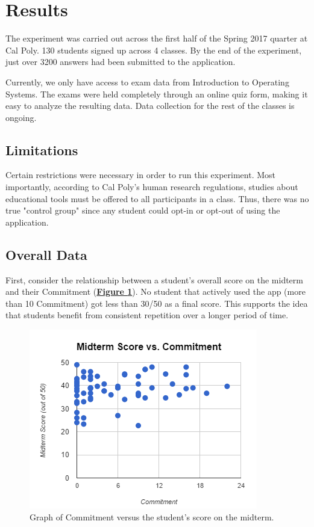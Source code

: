 \section{Results}
\par The experiment was carried out across the first half of the Spring 2017 quarter at Cal Poly. 130 students signed up across 4 classes. By the end of the experiment, just over 3200 answers had been submitted to the application.

\par Currently, we only have access to exam data from Introduction to Operating Systems. The exams were held completely through an online quiz form, making it easy to analyze the resulting data. Data collection for the rest of the classes is ongoing.

\subsection{Limitations}
\par Certain restrictions were necessary in order to run this experiment. Most importantly, according to Cal Poly's human research regulations, studies about educational tools must be offered to all participants in a class. Thus, there was no true "control group" since any student could opt-in or opt-out of using the application.

\subsection{Overall Data}
\par First, consider the relationship between a student's overall score on the midterm and their Commitment (\textbf{\hyperref[fig:comm_vs_score]{Figure \ref*{fig:comm_vs_score}}}). No student that actively used the app (more than 10 Commitment) got less than 30/50 as a final score. This supports the idea that students benefit from consistent repetition over a longer period of time.
 
 \begin{figure}[h]
 	\includegraphics{figures/commitment-data1}
 	\caption{Graph of Commitment versus the student's score on the midterm.}
 	\label{fig:comm_vs_score}
 \end{figure}
 

